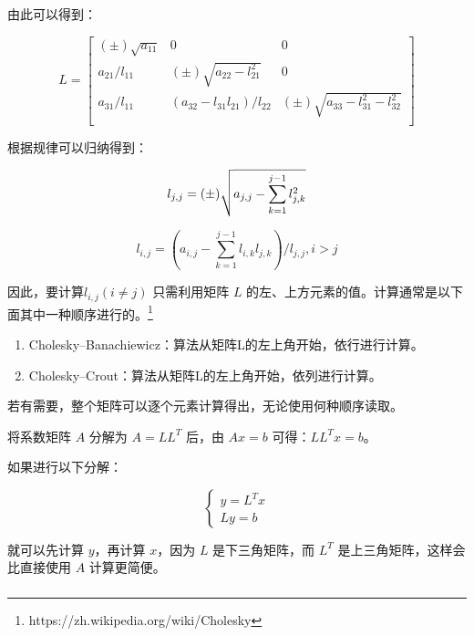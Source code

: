 由此可以得到：

\begin{equation*}
    L =
    \begin{bmatrix}
        (\pm) \sqrt{a_{11}}   & 0                            & 0                               \\
        a_{21} / l_{11} &  (\pm)\sqrt{a_{22}-l_{21}^2}       & 0                               \\
        a_{31} / l_{11} & (a_{32}-l_{31}l_{21})/l_{22} &  (\pm) \sqrt{a_{33}-l_{31}^2-l_{32}^2} \\
    \end{bmatrix}
\end{equation*}

根据规律可以归纳得到：

\begin{equation*}
    l_{j,j} = (\pm) \sqrt{a_{j,j} - \sum_{k=1}^{j-1} l_{j,k}^2} \\
\end{equation*}

\[
    l_{i,j} = (a_{i,j} - \sum_{k=1}^{j-1}l_{i,k}l_{j,k}) / l_{j,j},  i > j
\]

因此，要计算${l}_{i,j}(i\neq j)$ 只需利用矩阵 $L$ 的左、上方元素的值。计算通常是以下面其中一种顺序进行的。\footnote{https://zh.wikipedia.org/wiki/Cholesky}

\begin{enumerate}
    \item Cholesky–Banachiewicz：算法从矩阵L的左上角开始，依行进行计算。
    \item Cholesky–Crout：算法从矩阵L的左上角开始，依列进行计算。
\end{enumerate}

若有需要，整个矩阵可以逐个元素计算得出，无论使用何种顺序读取。

将系数矩阵 \(A\) 分解为 \(A = L L^T\) 后，由 \(Ax = b\)
可得：\(LL^Tx = b\)。

如果进行以下分解：

\[
    \left\{\begin{matrix}
        y = L^Tx \\
        Ly = b
    \end{matrix}\right.
\]


就可以先计算 \(y\)，再计算 \(x\)，因为 \(L\) 是下三角矩阵，而 \(L^T\)
是上三角矩阵，这样会比直接使用 \(A\) 计算更简便。

\subsubsection{}

